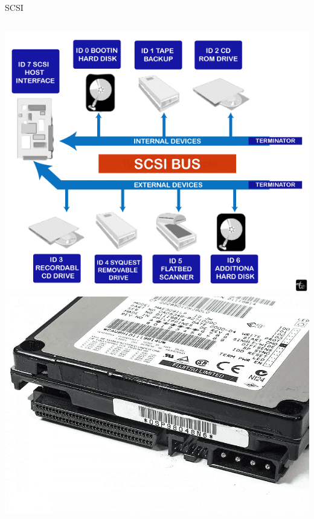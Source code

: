 \documentclass[aspectratio=43]{beamer}
\begin{document}
\begin{frame}{SCSI}
	
	
	\begin{columns}
		\includegraphics[width=1\linewidth]{extrahovane_obrazky/scsi_pr.png}
		\includegraphics[width=1\linewidth]{extrahovane_obrazky/scsi_hdd.png}
	\end{columns}
	
\end{frame}
\end{document}
